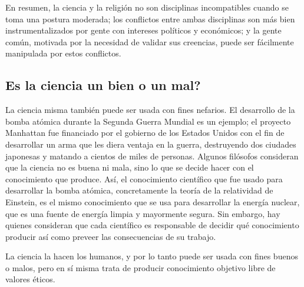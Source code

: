 En resumen, la ciencia y la religión no son disciplinas incompatibles cuando se
toma una postura moderada; los conflictos entre ambas disciplinas son más bien
instrumentalizados por gente con intereses políticos y económicos; y la gente
común, motivada por la necesidad de validar sus creencias, puede ser fácilmente
manipulada por estos conflictos.

\subsection*{Es la ciencia un bien o un mal?}
\label{sub:eslacienciaunbienounmal}

La ciencia misma también puede ser usada con fines nefarios.
El desarrollo de la bomba atómica durante la Segunda Guerra Mundial es un
ejemplo; el proyecto Manhattan fue financiado por el gobierno de los Estados
Unidos con el fin de desarrollar un arma que les diera ventaja en la guerra,
destruyendo dos ciudades japonesas y matando a cientos de miles de personas.
Algunos filósofos consideran que la ciencia no es buena ni mala, sino lo que
se decide hacer con el conocimiento que produce.
Así, el conocimiento científico que fue usado para desarrollar la bomba atómica,
concretamente la teoría de la relatividad de Einstein, es el mismo conocimiento
que se usa para desarrollar la energía nuclear, que es una fuente de energía
limpia y mayormente segura.
Sin embargo, hay quienes consideran que cada científico es responsable de
decidir qué conocimiento producir así como preveer las consecuencias de su
trabajo.

\begin{remember}
    \label{rem:cienciabienomal}
    La ciencia la hacen los humanos, y por lo tanto puede ser usada con fines
    buenos o malos, pero en sí misma trata de producir conocimiento objetivo
    libre de valores éticos.
\end{remember}

